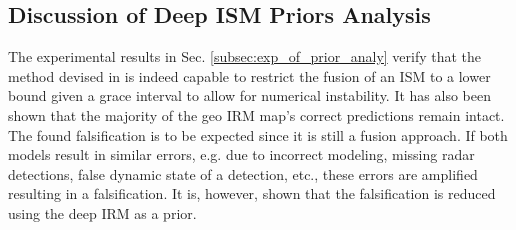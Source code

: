 \subsection{Discussion of Deep ISM Priors Analysis}
\label{subsec:discussion_of_prior_analy}
The experimental results in Sec. \ref{subsec:exp_of_prior_analy} verify that the method devised in  is indeed capable to restrict the fusion of an ISM to a lower bound given a grace interval to allow for numerical instability. It has also been shown that the majority of the geo IRM map's correct predictions remain intact. The found falsification is to be expected since it is still a fusion approach. If both models result in similar errors, e.g. due to incorrect modeling, missing radar detections, false dynamic state of a detection, etc., these errors are amplified resulting in a falsification. It is, however, shown that the falsification is reduced using the deep IRM as a prior.